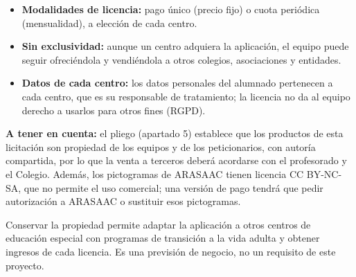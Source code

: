 \documentclass[11pt,a4paper]{article}
\newcommand{\hl}[1]{\textcolor{gblue}{\textbf{#1}}}
\newcommand{\bloque}[1]{\par\medskip\noindent{\bfseries\color{gnavy}#1}\par\nopagebreak\smallskip}
\begin{document}
\begin{itemize}
\item \hl{Modalidades de licencia:} pago único (precio fijo) o cuota periódica (mensualidad), a elección de cada centro.
\item \hl{Sin exclusividad:} aunque un centro adquiera la aplicación, el equipo puede seguir ofreciéndola y vendiéndola a otros colegios, asociaciones y entidades.
\item \hl{Datos de cada centro:} los datos personales del alumnado pertenecen a cada centro, que es su responsable de tratamiento; la licencia no da al equipo derecho a usarlos para otros fines (RGPD).
\end{itemize}
\hl{A tener en cuenta:} el pliego (apartado 5) establece que los productos de esta licitación son propiedad de los equipos y de los peticionarios, con autoría compartida, por lo que la venta a terceros deberá acordarse con el profesorado y el Colegio. Además, los pictogramas de ARASAAC tienen licencia CC BY-NC-SA, que no permite el uso comercial; una versión de pago tendrá que pedir autorización a ARASAAC o sustituir esos pictogramas.

\bloque{Beneficio para el equipo}
Conservar la propiedad permite adaptar la aplicación a otros centros de educación especial con programas de transición a la vida adulta y obtener ingresos de cada licencia. Es una previsión de negocio, no un requisito de este proyecto.
\end{document}
